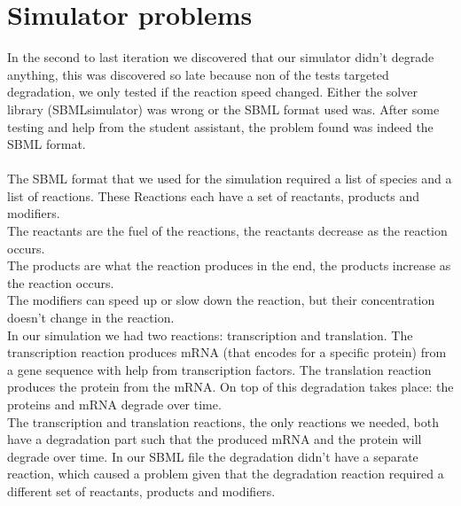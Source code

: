\documentclass[a4paper]{article}
\begin{document}
\section*{Simulator problems}
In the second to last iteration we discovered that our simulator didn't degrade anything, this was discovered so late because non of the tests targeted degradation, we only tested if the reaction speed changed. Either the solver library (SBMLsimulator) was wrong or the SBML format used was. After some testing and help from the student assistant, the problem found was indeed the SBML format.\\\\
The SBML format that we used for the simulation required a list of species and a list of reactions. These Reactions each have a set of reactants, products and modifiers.\\
The reactants are the fuel of the reactions, the reactants decrease as the reaction occurs.\\
The products are what the reaction produces in the end, the products increase as the reaction occurs.\\
The modifiers can speed up or slow down the reaction, but their concentration doesn't change in the reaction.\\
In our simulation we had two reactions: transcription and translation. The transcription reaction produces mRNA (that encodes for a specific protein) from a gene sequence with help from transcription factors. The translation reaction produces the protein from the mRNA. On top of this degradation takes place: the proteins and mRNA degrade over time.\\
The transcription and translation reactions, the only reactions we needed, both have a degradation part such that the produced mRNA and the protein will degrade over time. In our SBML file the degradation didn't have a separate reaction, which caused a problem given that the degradation reaction required a different set of reactants, products and modifiers.
\end{document}
